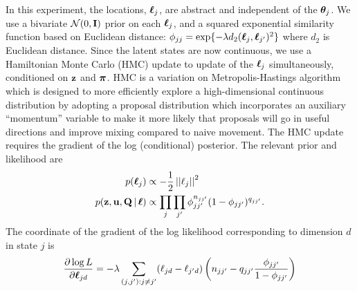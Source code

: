 In this experiment, the locations, $\boldsymbol{\ell}_j$, are abstract and
independent of the $\boldsymbol{\theta}_j$.  We use a bivariate
$\mathcal{N}(0,\mathbf{I})$ prior on each $\boldsymbol{\ell}_j$, and a squared exponential
similarity function based on Euclidean distance: $\phi_{jj} =
\exp\{-\lambda d_2(\boldsymbol{\ell}_j, \boldsymbol{\ell}_{j'})^2\}$ where $d_2$ is Euclidean
distance.  Since the latent
states are now continuous, we use a Hamiltonian Monte Carlo (HMC) update
\cite{duane1987hybrid, neal2011mcmc} to update of the $\boldsymbol{\ell}_j$
simultaneously, conditioned on $\mathbf{z}$ and $\boldsymbol{\pi}$.  
HMC is a variation on Metropolis-Hastings
algorithm which is designed to more efficiently explore a
high-dimensional continuous distribution by adopting a proposal
distribution which incorporates an auxiliary ``momentum'' variable to
make it more likely that proposals will go in useful directions and
improve mixing compared to naive movement.  The HMC update requires
the gradient of the log (conditional) posterior.  The relevant prior
and likelihood are
\begin{align}
\begin{split}
  p(\boldsymbol{\ell}_j) &\propto -\frac{1}{2} \left\vert \left \vert \ell_j \right\vert \right\vert^2 \\
  p(\mathbf{z}, \mathbf{u}, \mathbf{Q} \, \vert \, \boldsymbol{\ell}) &\propto \prod_j \prod_{j'}
  \phi_{jj'}^{n_{jj'}}(1 - \phi_{jj'})^{q_{jj'}}.
\end{split}
\end{align}
The coordinate of the gradient of the log likelihood corresponding to
dimension $d$ in state $j$ is
\begin{equation*}
  \frac{\partial \log L}{\partial \boldsymbol{\ell}_{jd}} = -\lambda
  \sum_{(j,j'):j \neq j'} (\ell_{jd} - \ell_{j'd}) \left(n_{jj'} - q_{jj'} \frac{\phi_{jj'}}{1 - \phi_{jj'}}\right)
\end{equation*}
